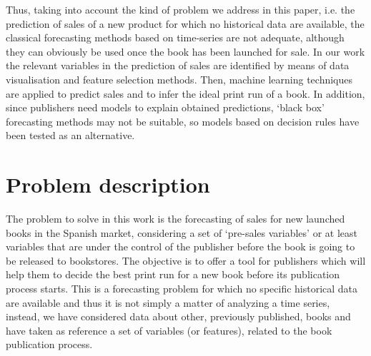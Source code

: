 \documentclass[a4paper,10pt,twocolumn,preprint,3p]{elsarticle}
\begin{document}
Thus, taking into account the kind of problem we address in this
paper, i.e. the prediction of sales of a new product for which no
historical data are available, the classical forecasting methods based
on time-series are not adequate, although they can obviously be used once 
the book has been launched for sale. 
In our work the relevant variables in the prediction of sales are identified
by means of data visualisation and feature selection methods. 
Then, machine learning techniques are applied to predict sales and to infer 
the ideal print run of a book.
In addition, since publishers need models to explain obtained predictions, 
`black box' forecasting methods may not be suitable, so models based
on decision rules have been tested as an alternative. 


\section{Problem description}
\label{sec:problem}

The problem to solve in this work is the forecasting of sales for new
launched books in the Spanish market, considering a set of `pre-sales
variables' or at least variables that are under the control of the
publisher before the book is going to be released to bookstores. The
objective is to offer a tool for publishers which will help them to
decide the best print run for a new book before its publication
process starts. This is a forecasting problem for which no specific
historical data are available and thus it is not simply a matter of
analyzing a time series, instead, we have considered data about other,
previously published, books and have taken as reference a set of
variables (or features), 
related to the book publication process. 
\end{document}
